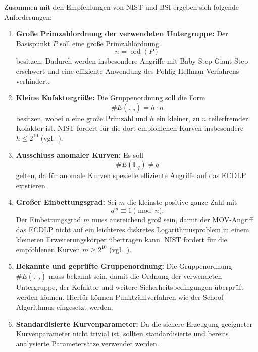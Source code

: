Zusammen mit den Empfehlungen von NIST und BSI ergeben sich folgende Anforderungen:
\begin{enumerate}
    \item \textbf{Große Primzahlordnung der verwendeten Untergruppe:}
          Der Basispunkt $P$ soll eine große Primzahlordnung
          \[
              n=\operatorname{ord}(P)
          \]
          besitzen. Dadurch werden insbesondere Angriffe mit
          Baby-Step-Giant-Step erschwert und eine effiziente Anwendung des
          Pohlig-Hellman-Verfahrens verhindert.
    \item \textbf{Kleine Kofaktorgröße:}
          Die Gruppenordnung soll die Form
          \[
              \#E(\mathbb F_q)=h\cdot n
          \]
          besitzen, wobei $n$ eine große Primzahl und $h$ ein kleiner,
          zu $n$ teilerfremder Kofaktor ist. NIST fordert für die dort
          empfohlenen Kurven insbesondere $h\leq 2^{10}$ (vgl.~\cite[~S.35]{nist23}).

    \item \textbf{Ausschluss anomaler Kurven:}
          Es soll
          \[
              \#E(\mathbb F_q)\neq q
          \]
          gelten, da für anomale Kurven spezielle effiziente Angriffe auf
          das ECDLP existieren.

    \item \textbf{Großer Einbettungsgrad:}
          Sei $m$ die kleinste positive ganze Zahl mit
          \[
              q^m\equiv 1\pmod n.
          \]
          Der Einbettungsgrad $m$ muss ausreichend groß sein, damit der
          MOV-Angriff das ECDLP nicht auf ein leichteres diskretes
          Logarithmusproblem in einem kleineren Erweiterungskörper übertragen kann. NIST fordert für die empfohlenen Kurven $m\geq 2^{10}$ (vgl.~\cite[~S.35]{nist23}).

    \item \textbf{Bekannte und geprüfte Gruppenordnung:}
          Die Gruppenordnung $\#E(\mathbb F_q)$ muss bekannt sein, damit die
          Ordnung der verwendeten Untergruppe, der Kofaktor und weitere
          Sicherheitsbedingungen überprüft werden können. Hierfür können
          Punktzählverfahren wie der Schoof-Algorithmus eingesetzt werden.

    \item \textbf{Standardisierte Kurvenparameter:}
          Da die sichere Erzeugung geeigneter Kurvenparameter nicht trivial
          ist, sollten standardisierte und bereits analysierte Parametersätze
          verwendet werden.
\end{enumerate}
